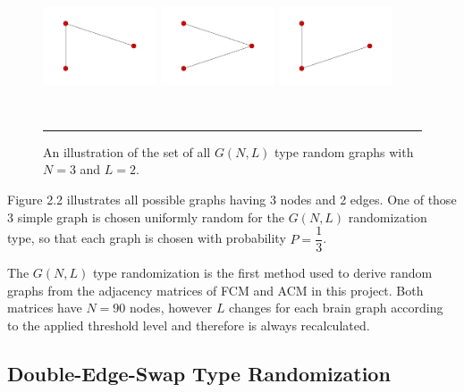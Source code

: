 \begin{figure}[htbp]
  \centering
	\includegraphics[width=0.30\textwidth, height=40mm]{Figures/f1.png}  
	\includegraphics[width=0.30\textwidth, height=40mm]{Figures/f2.png} 
    \includegraphics[width=0.30\textwidth, height=40mm]{Figures/f3.png}

    \rule{35em}{0.5pt}
  \caption[Erdos-Renyi Example]{An illustration of the set of all $G(N,L)$ type random graphs with $N=3$ and $L=2$.}
  \label{fig:Erdos-Renyi Example}
\end{figure}

Figure 2.2 illustrates all possible graphs having 3 nodes and 2 edges. One of those 3 simple graph is chosen uniformly random for the $G(N,L)$ randomization type, so that each graph is chosen with probability $P=\dfrac{1}{3}$.  

The $G(N,L)$ type randomization is the first method used to derive random graphs from the adjacency matrices of FCM and ACM in this project. Both matrices have $N=90$ nodes, however $L$ changes for each brain graph according to the applied threshold level and therefore is always recalculated. 

\subsection{Double-Edge-Swap Type Randomization}

